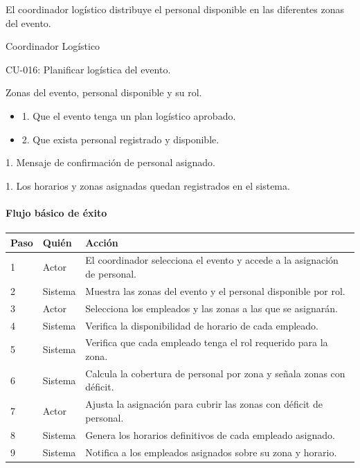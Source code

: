 \begin{description}[leftmargin=!, labelwidth=3.4cm, style=nextline, topsep=3pt]
\item[Objetivo] El coordinador logístico distribuye el personal disponible en las diferentes zonas del evento.

\item[Actores] Coordinador Logístico

\item[CU relacionados] CU-016: Planificar logística del evento.

\item[Entradas] Zonas del evento, personal disponible y su rol.

\item[Pre-condiciones] \hfill
\begin{itemize}[leftmargin=1.2em, topsep=1pt]
  \item 1. Que el evento tenga un plan logístico aprobado.
  \item 2. Que exista personal registrado y disponible.
\end{itemize}

\item[Salidas] 1. Mensaje de confirmación de personal asignado.

\item[Post-condiciones] 1. Los horarios y zonas asignadas quedan registrados en el sistema.

\end{description}

\paragraph{Flujo básico de éxito}
\begin{longtable}{P{1.1cm}P{1.8cm}P{10.5cm}}
\toprule
\textbf{Paso} & \textbf{Quién} & \textbf{Acción}\\
\midrule
{} & Actor & El coordinador selecciona el evento y accede a la asignación de personal.\\
2 & Sistema & Muestra las zonas del evento y el personal disponible por rol.\\
3 & Actor & Selecciona los empleados y las zonas a las que se asignarán.\\
4 & Sistema & Verifica la disponibilidad de horario de cada empleado.\\
5 & Sistema & Verifica que cada empleado tenga el rol requerido para la zona.\\
6 & Sistema & Calcula la cobertura de personal por zona y señala zonas con déficit.\\
7 & Actor & Ajusta la asignación para cubrir las zonas con déficit de personal.\\
8 & Sistema & Genera los horarios definitivos de cada empleado asignado.\\
9 & Sistema & Notifica a los empleados asignados sobre su zona y horario.\\
\bottomrule
\end{longtable}

